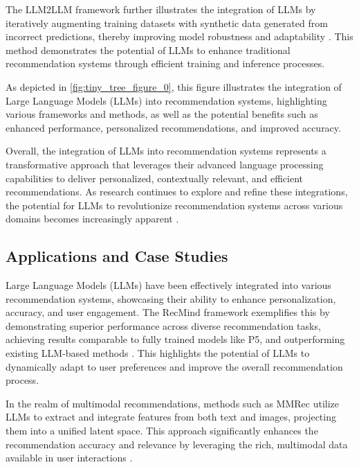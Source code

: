 The LLM2LLM framework further illustrates the integration of LLMs by iteratively augmenting training datasets with synthetic data generated from incorrect predictions, thereby improving model robustness and adaptability \cite{lee2024llm2llmboostingllmsnovel}. This method demonstrates the potential of LLMs to enhance traditional recommendation systems through efficient training and inference processes.

As depicted in \autoref{fig:tiny_tree_figure_0}, this figure illustrates the integration of Large Language Models (LLMs) into recommendation systems, highlighting various frameworks and methods, as well as the potential benefits such as enhanced performance, personalized recommendations, and improved accuracy.

Overall, the integration of LLMs into recommendation systems represents a transformative approach that leverages their advanced language processing capabilities to deliver personalized, contextually relevant, and efficient recommendations. As research continues to explore and refine these integrations, the potential for LLMs to revolutionize recommendation systems across various domains becomes increasingly apparent \cite{hua2023tutorial}.


\subsection{Applications and Case Studies} \label{subsec:Applications and Case Studies}



Large Language Models (LLMs) have been effectively integrated into various recommendation systems, showcasing their ability to enhance personalization, accuracy, and user engagement. The RecMind framework exemplifies this by demonstrating superior performance across diverse recommendation tasks, achieving results comparable to fully trained models like P5, and outperforming existing LLM-based methods \cite{wang2023recmind}. This highlights the potential of LLMs to dynamically adapt to user preferences and improve the overall recommendation process.



In the realm of multimodal recommendations, methods such as MMRec utilize LLMs to extract and integrate features from both text and images, projecting them into a unified latent space. This approach significantly enhances the recommendation accuracy and relevance by leveraging the rich, multimodal data available in user interactions \cite{tian2024mmrecllmbasedmultimodal}.



